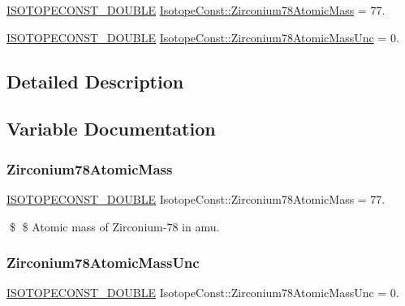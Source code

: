\begin{DoxyCompactItemize}
\item 
\mbox{\hyperlink{group___isotope_const-_macros_ga8f45a7272ce02c0b4c65c44636ed719a}{I\+S\+O\+T\+O\+P\+E\+C\+O\+N\+S\+T\+\_\+\+D\+O\+U\+B\+LE}} \mbox{\hyperlink{group___isotope_const-_zirconium-_zr78_ga89272374adfbdb02aa163126d98a34ae}{Isotope\+Const\+::\+Zirconium78\+Atomic\+Mass}} = 77.
\item 
\mbox{\hyperlink{group___isotope_const-_macros_ga8f45a7272ce02c0b4c65c44636ed719a}{I\+S\+O\+T\+O\+P\+E\+C\+O\+N\+S\+T\+\_\+\+D\+O\+U\+B\+LE}} \mbox{\hyperlink{group___isotope_const-_zirconium-_zr78_ga7140df85bc70dbe9c37e8f0e496faee1}{Isotope\+Const\+::\+Zirconium78\+Atomic\+Mass\+Unc}} = 0.
\end{DoxyCompactItemize}


\subsection{Detailed Description}


\subsection{Variable Documentation}
\mbox{\label{group___isotope_const-_zirconium-_zr78_ga89272374adfbdb02aa163126d98a34ae}} 
\subsubsection{\texorpdfstring{Zirconium78\+Atomic\+Mass}{Zirconium78AtomicMass}}
{\footnotesize\ttfamily \mbox{\hyperlink{group___isotope_const-_macros_ga8f45a7272ce02c0b4c65c44636ed719a}{I\+S\+O\+T\+O\+P\+E\+C\+O\+N\+S\+T\+\_\+\+D\+O\+U\+B\+LE}} Isotope\+Const\+::\+Zirconium78\+Atomic\+Mass = 77.}

\$ \$ Atomic mass of Zirconium-\/78 in amu. \mbox{\label{group___isotope_const-_zirconium-_zr78_ga7140df85bc70dbe9c37e8f0e496faee1}} 
\subsubsection{\texorpdfstring{Zirconium78\+Atomic\+Mass\+Unc}{Zirconium78AtomicMassUnc}}
{\footnotesize\ttfamily \mbox{\hyperlink{group___isotope_const-_macros_ga8f45a7272ce02c0b4c65c44636ed719a}{I\+S\+O\+T\+O\+P\+E\+C\+O\+N\+S\+T\+\_\+\+D\+O\+U\+B\+LE}} Isotope\+Const\+::\+Zirconium78\+Atomic\+Mass\+Unc = 0.}

